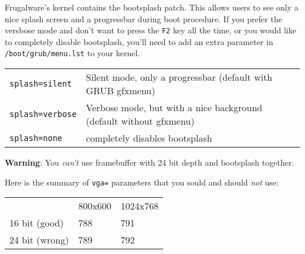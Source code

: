 Frugalware's kernel contains the bootsplash patch. This allows users to see only a nice splash screen and a progressbar during boot procedure. If you prefer the versbose mode and don't want to press the {\tt F2} key all the time, or you would like to completely disable bootsplash, you'll need to add an extra parameter in {\tt /boot/grub/menu.lst} to your kernel.

\begin{tabular}{ll}
{\tt splash=silent} & Silent mode, only a progressbar (default with GRUB gfxmenu) \\
{\tt splash=verbose} & Verbose mode, but with a nice background (default without gfxmenu) \\
{\tt splash=none} & completely disables bootsplash \\
\end{tabular}

\textbf{Warning}: You \textit{can't} use framebuffer with 24 bit depth and bootsplash together.

Here is the summary of {\tt vga=} parameters that you sould and should \textit{not} use:

\begin{tabular}{lll}
 & 800x600 & 1024x768 \\
16 bit (good) &  788 & 791 \\
24 bit (wrong) &  789 & 792 \\
\end{tabular} 